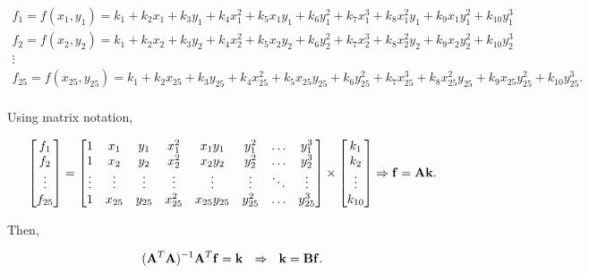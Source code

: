 \documentclass{ipol}
\numberwithin{equation}{section}
\numberwithin{table}{section}
\numberwithin{figure}{section}
\begin{document}
\begin{equation*}
	\begin{array}{l}
		f_1 = f(x_1,y_1) = k_1 + k_2x_1 + k_3y_1 + k_4x_1^2 + k_5x_1y_1 + k_6y_1^2 + k_7x_1^3 + k_8x_1^2y_1 + k_9x_1y_1^2 + k_{10}y_1^3\\
		f_2 = f(x_2,y_2) = k_1 + k_2x_2 + k_3y_2 + k_4x_2^2 + k_5x_2y_2 + k_6y_2^2 + k_7x_2^3 + k_8x_2^2y_2 + k_9x_2y_2^2 + k_{10}y_2^3\\
		\vdots \\
		f_{25} = f(x_{25},y_{25}) = k_1 + k_2x_{25} + k_3y_{25} + k_4x_{25}^2 + k_5x_{25}y_{25} + k_6y_{25}^2 + k_7x_{25}^3 + k_8x_{25}^2y_{25} + k_9x_{25}y_{25}^2 + k_{10}y_{25}^3 .\\
	\end{array}
\end{equation*}

Using matrix notation,

\begin{equation*}
	\begin{bmatrix} 
		f_1		\\ 
		f_2		\\ 
		\vdots	\\
		f_{25}
	\end{bmatrix} 
	= 
	\begin{bmatrix} 
		1 		& x_1 		& y_1 		& x_1^2 	& x_1y_1 		& y_1^2 	& \hdots 	& y_1^3 	\\
		1 		& x_2 		& y_2 		& x_2^2 	& x_2y_2 		& y_2^2 	& \hdots 	& y_2^3 	\\
		\vdots	& \vdots	& \vdots	& \vdots	& \vdots		& \vdots	& \ddots	& \vdots	\\
		1 		& x_{25}	& y_{25}	& x_{25}^2 	& x_{25}y_{25} 	& y_{25}^2 	& \hdots 	& y_{25}^3
	\end{bmatrix}
	\times
	\begin{bmatrix}
		k_1		\\
		k_2		\\
		\vdots	\\
		k_{10}
	\end{bmatrix}
	\Rightarrow \mathbf{f} = \mathbf{A}\mathbf{k} .\\
\end{equation*}

Then,

\begin{equation*}
	(\mathbf{A}^T\mathbf{A})^{-1}\mathbf{A}^T\mathbf{f} = \mathbf{k} \ \ \Rightarrow \ \ \mathbf{k} = \mathbf{B}\mathbf{f} .\\
\end{equation*}
\end{document}
